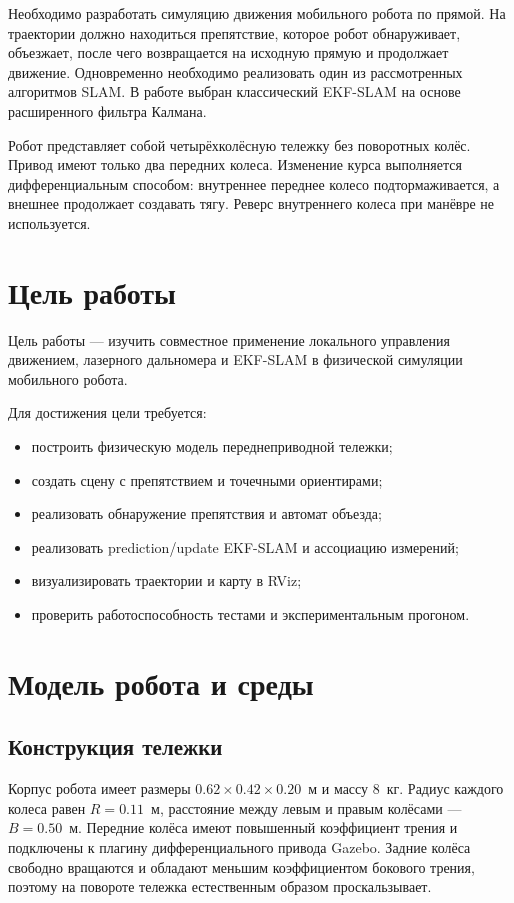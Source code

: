 \documentclass[a4paper,12pt]{article}
\begin{document}
Необходимо разработать симуляцию движения мобильного робота по прямой. На
траектории должно находиться препятствие, которое робот обнаруживает, объезжает,
после чего возвращается на исходную прямую и продолжает движение. Одновременно
необходимо реализовать один из рассмотренных алгоритмов SLAM. В работе выбран
классический EKF-SLAM на основе расширенного фильтра Калмана.

Робот представляет собой четырёхколёсную тележку без поворотных колёс. Привод
имеют только два передних колеса. Изменение курса выполняется дифференциальным
способом: внутреннее переднее колесо подтормаживается, а внешнее продолжает
создавать тягу. Реверс внутреннего колеса при манёвре не используется.

\section{Цель работы}

Цель работы --- изучить совместное применение локального управления движением,
лазерного дальномера и EKF-SLAM в физической симуляции мобильного робота.

Для достижения цели требуется:

\begin{itemize}
    \item построить физическую модель переднеприводной тележки;
    \item создать сцену с препятствием и точечными ориентирами;
    \item реализовать обнаружение препятствия и автомат объезда;
    \item реализовать prediction/update EKF-SLAM и ассоциацию измерений;
    \item визуализировать траектории и карту в RViz;
    \item проверить работоспособность тестами и экспериментальным прогоном.
\end{itemize}

\section{Модель робота и среды}

\subsection{Конструкция тележки}

Корпус робота имеет размеры $0.62\times0.42\times0.20$~м и массу 8~кг.
Радиус каждого колеса равен $R=0.11$~м, расстояние между левым и правым
колёсами --- $B=0.50$~м. Передние колёса имеют повышенный коэффициент трения и
подключены к плагину дифференциального привода Gazebo. Задние колёса свободно
вращаются и обладают меньшим коэффициентом бокового трения, поэтому на повороте
тележка естественным образом проскальзывает.
\end{document}
